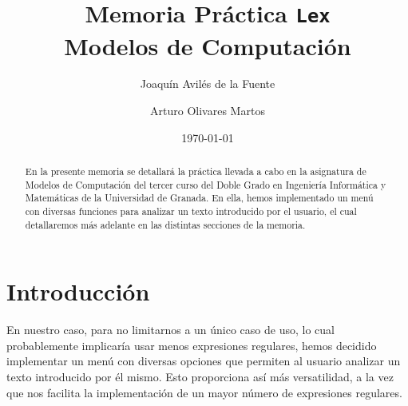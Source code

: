 \documentclass[12pt]{article}
\author{Joaquín Avilés de la Fuente \and Arturo Olivares Martos}
\date{\today}
\title{Memoria Práctica \texttt{Lex}\\Modelos de Computación}
\begin{document}
    

    \maketitle
    \tableofcontents

    \begin{abstract}
        En la presente memoria se detallará la práctica llevada a cabo en la asignatura de Modelos de Computación del tercer curso del Doble Grado en Ingeniería Informática y Matemáticas de la Universidad de Granada.
        En ella, hemos implementado un menú con diversas funciones para analizar un texto introducido por el usuario, el cual detallaremos más adelante en las distintas secciones de la memoria.
    \end{abstract}

    \newpage
    \section{Introducción}

    En nuestro caso, para no limitarnos a un único caso de uso, lo cual probablemente implicaría usar menos expresiones regulares, hemos decidido implementar un menú con diversas opciones que permiten al usuario analizar un texto introducido por él mismo. Esto proporciona así más versatilidad, a la vez que nos facilita la implementación de un mayor número de expresiones regulares.
\end{document}
